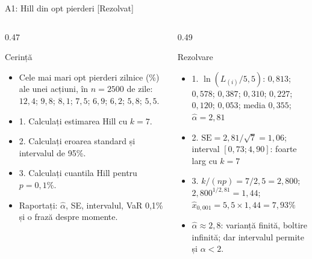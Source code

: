 \begin{frame}{A1: Hill din opt pierderi [Rezolvat]}
\itemsize{\scriptsize}
\begin{columns}[T]
\begin{column}{0.47\textwidth}
\begin{block}{Cerință}
\begin{itemize}
    \item Cele mai mari opt pierderi zilnice (\%) ale unei acțiuni, în $n = 2500$ de zile: $12{,}4$; $9{,}8$; $8{,}1$; $7{,}5$; $6{,}9$; $6{,}2$; $5{,}8$; $5{,}5$.
    \item 1. Calculați estimarea Hill cu $k = 7$.
    \item 2. Calculați eroarea standard și intervalul de 95\%.
    \item 3. Calculați cuantila Hill pentru $p = 0{,}1\%$.
    \item Raportați: $\hat\alpha$, SE, intervalul, VaR 0,1\% și o frază despre momente.
\end{itemize}
\end{block}
\end{column}
\begin{column}{0.49\textwidth}
\begin{exampleblock}{Rezolvare}
\begin{itemize}
    \item 1. $\ln(L_{(i)}/5{,}5)$: $0{,}813$; $0{,}578$; $0{,}387$; $0{,}310$; $0{,}227$; $0{,}120$; $0{,}053$; media $0{,}355$; $\hat\alpha = 2{,}81$
    \item 2. $\mathrm{SE} = 2{,}81/\sqrt7 = 1{,}06$; interval $[0{,}73; 4{,}90]$: foarte larg cu $k = 7$
    \item 3. $k/(np) = 7/2{,}5 = 2{,}800$; $2{,}800^{1/2{,}81} = 1{,}44$; $\hat x_{0{,}001} = 5{,}5 \times 1{,}44 = 7{,}93\%$
    \item $\hat\alpha \approx 2{,}8$: varianță finită, boltire infinită; dar intervalul permite și $\alpha < 2$.
\end{itemize}
\end{exampleblock}
\end{column}
\end{columns}
\end{frame}

